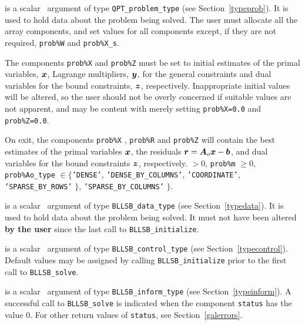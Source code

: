 \documentclass{galahad}
\newcommand{\packagename}{BLLSB}
\begin{document}
\begin{description}
 is a scalar \intentinout\ argument of type
{\tt QPT\_problem\_type}
(see Section~\ref{typeprob}).
It is used to hold data about the problem being solved.
The user must allocate all the array components,
and set values for all components except,
if they are not required, {\tt prob\%W} and {\tt prob\%X\_s}.

The components {\tt prob\%X} and {\tt prob\%Z}
must be set to initial estimates of the primal variables, ${\bm{x}}$,
Lagrange multipliers, ${\bm{y}}$, for the general constraints
and dual variables for the bound constraints, ${\bm{z}}$, respectively.
Inappropriate initial values will be altered, so the user should
not be overly concerned if suitable values are not apparent, and may be
content with merely setting {\tt prob\%X=0.0} and {\tt prob\%Z=0.0}.

On exit, the components {\tt prob\%X} , {\tt prob\%R} and {\tt prob\%Z}
will contain the best estimates of the primal variables ${\bm{x}}$,
the residuals ${\bm{r}} = {\bm{A}}_o {\bm{x}} - {\bm{b}}$,
and dual variables for the bound constraints ${\bm{z}}$, respectively.
 $> 0$, {\tt prob\%m} $\geq 0$,
 {\tt prob\%Ao\_type} $\in \{${\tt 'DENSE'},
 {\tt 'DENSE\_BY\_COLUMNS'},
 {\tt 'COORDINATE'}, {\tt 'SPARSE\_BY\_\-ROWS'} $\}$,
 {\tt 'SPARSE\_BY\_\-COLUMNS'} $\}$.

 is a scalar \intentinout\ argument of type
{\tt \packagename\_data\_type}
(see Section~\ref{typedata}). It is used to hold data about the problem being
solved. It must not have been altered {\bf by the user} since the last call to
{\tt \packagename\_initialize}.

 is a scalar \intentin\ argument of type
{\tt \packagename\_control\_type}
(see Section~\ref{typecontrol}). Default values may be assigned by calling
{\tt \packagename\_initialize} prior to the first call to
{\tt \packagename\_solve}.

 is a scalar \intentinout\ argument of type
{\tt \packagename\_inform\_type}
(see Section~\ref{typeinform}).
A successful call to
{\tt \packagename\_solve}
is indicated when the  component {\tt status} has the value 0.
For other return values of {\tt status}, see Section~\ref{galerrors}.

\end{description}

\end{document}
